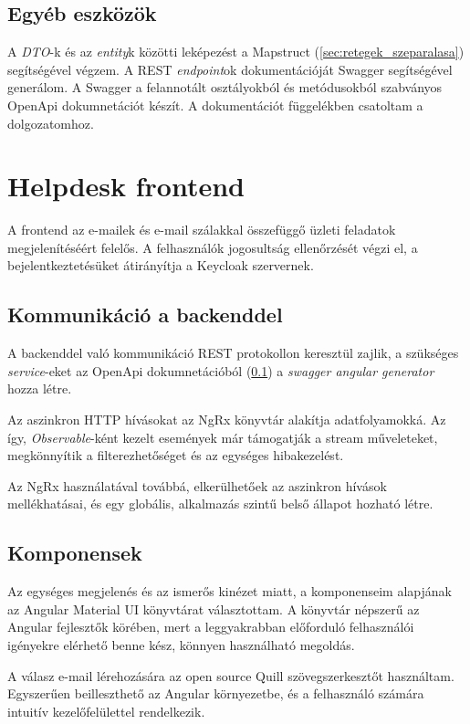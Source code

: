 \subsection{Egyéb eszközök}\label{sec:backend_egyeb_eszkozok}
A \textit{DTO}-k és az \textit{entity}k közötti leképezést a Mapstruct (\ref{sec:retegek_szeparalasa}) segítségével végzem. A REST \textit{endpoint}ok dokumentációját Swagger segítségével generálom. A Swagger a felannotált osztályokból és metódusokból szabványos OpenApi dokumnetációt készít. A dokumentációt  függelékben csatoltam a dolgozatomhoz.




\section{Helpdesk frontend}
A frontend az e-mailek és e-mail szálakkal összefüggő üzleti feladatok megjelenítéséért felelős. A felhasználók jogosultság ellenőrzését végzi el, a bejelentkeztetésüket átirányítja a Keycloak szervernek. 


\subsection{Kommunikáció a backenddel}
A backenddel való kommunikáció REST protokollon keresztül zajlik, a szükséges \textit{service}-eket az OpenApi dokumnetációból (\ref{sec:backend_egyeb_eszkozok}) a \textit{swagger angular generator} hozza létre.

Az aszinkron HTTP hívásokat az NgRx könyvtár alakítja adatfolyamokká. 
Az így, \textit{Observable}-ként kezelt események már támogatják a stream műveleteket, megkönnyítik a filterezhetőséget és az egységes hibakezelést. 

Az NgRx használatával továbbá, elkerülhetőek az aszinkron hívások mellékhatásai, és egy globális, alkalmazás szintű belső állapot hozható létre.

\subsection{Komponensek}
Az egységes megjelenés és az ismerős kinézet miatt, a komponenseim alapjának az Angular Material UI könyvtárat választottam. A könyvtár	népszerű az Angular fejlesztők körében, mert a leggyakrabban előforduló felhasználói igényekre elérhető benne kész, könnyen használható megoldás.

A válasz e-mail lérehozására az open source Quill szövegszerkesztőt használtam.
Egyszerűen beilleszthető az Angular környezetbe, és a felhasználó számára intuitív kezelőfelülettel rendelkezik.


